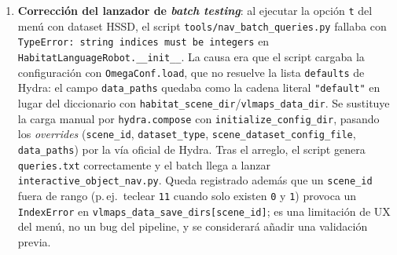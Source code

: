 \documentclass[11pt,a4paper]{article}
\begin{document}
\begin{enumerate}
  \item \textbf{Corrección del lanzador de \textit{batch testing}}: al ejecutar
        la opción \texttt{t} del menú con dataset HSSD, el script
        \texttt{tools/nav\_batch\_queries.py} fallaba con
        \texttt{TypeError: string indices must be integers} en
        \texttt{HabitatLanguageRobot.\_\_init\_\_}. La causa era que el script
        cargaba la configuración con \texttt{OmegaConf.load}, que no resuelve
        la lista \texttt{defaults} de Hydra: el campo \texttt{data\_paths}
        quedaba como la cadena literal \texttt{"default"} en lugar del
        diccionario con \texttt{habitat\_scene\_dir}/\texttt{vlmaps\_data\_dir}.
        Se sustituye la carga manual por \texttt{hydra.compose} con
        \texttt{initialize\_config\_dir}, pasando los \emph{overrides}
        (\texttt{scene\_id}, \texttt{dataset\_type},
        \texttt{scene\_dataset\_config\_file}, \texttt{data\_paths}) por la
        vía oficial de Hydra. Tras el arreglo, el script genera
        \texttt{queries.txt} correctamente y el batch llega a lanzar
        \texttt{interactive\_object\_nav.py}. Queda registrado además que un
        \texttt{scene\_id} fuera de rango (p.\,ej.\ teclear \texttt{11} cuando
        solo existen \texttt{0} y \texttt{1}) provoca un \texttt{IndexError}
        en \texttt{vlmaps\_data\_save\_dirs[scene\_id]}; es una limitación
        de UX del menú, no un bug del pipeline, y se considerará añadir una
        validación previa.


\end{enumerate}
\end{document}
